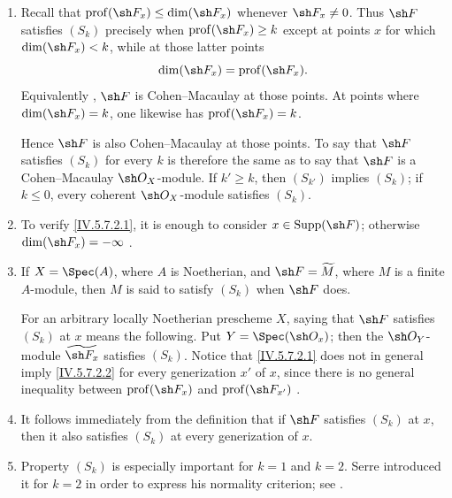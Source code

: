 \begin{remarks}[5.7.3]
\label{IV.5.7.3}
\begin{enumerate}[{\rm(i)}]
\item
{}
\label{IV.5.7.3.i}
Recall that
$\operatorname{prof}(\sh F_x)\leq\dim(\sh F_x)$
 whenever $\sh F_x\neq0$.  Thus $\sh F$
satisfies $(S_k)$ precisely when
$\operatorname{prof}(\sh F_x)\geq k$ except at points $x$ for which
$\dim(\sh F_x)<k$, while at those latter points
\[
\dim(\sh F_x)=\operatorname{prof}(\sh F_x).
\]
Equivalently , $\sh F$ is Cohen--Macaulay at those
points.  At points where $\dim(\sh F_x)=k$, one likewise has
$\operatorname{prof}(\sh F_x)=k$.


Hence $\sh F$ is also Cohen--Macaulay at those points.  To say that
$\sh F$ satisfies $(S_k)$ for every $k$ is therefore the same as to
say that $\sh F$ is a Cohen--Macaulay $\sh O_X$-module.  If
$k'\geq k$, then $(S_{k'})$ implies $(S_k)$; if $k\leq0$, every
coherent $\sh O_X$-module satisfies $(S_k)$.

\item
{}
\label{IV.5.7.3.ii}
To verify \eqref{IV.5.7.2.1}, it is enough to consider
$x\in\operatorname{Supp}(\sh F)$; otherwise
$\dim(\sh F_x)=-\infty$ .

\item
{}
\label{IV.5.7.3.iii}
If $X=\Spec(A)$, where $A$ is Noetherian, and
$\sh F=\widetilde M$, where $M$ is a finite $A$-module, then $M$ is
said to satisfy $(S_k)$ when $\sh F$ does.

For an arbitrary locally Noetherian prescheme $X$, saying that
$\sh F$ satisfies $(S_k)$ at $x$ means the following.  Put
$Y=\Spec(\sh O_x)$; then the $\sh O_Y$-module
$\widetilde{\sh F_x}$ satisfies $(S_k)$.  Notice that
\eqref{IV.5.7.2.1} does not in general imply
\eqref{IV.5.7.2.2} for every generization $x'$ of $x$, since there
is no general inequality between
$\operatorname{prof}(\sh F_x)$ and
$\operatorname{prof}(\sh F_{x'})$ .

\item
{}
\label{IV.5.7.3.iv}
It follows immediately from the definition that if $\sh F$
satisfies $(S_k)$ at $x$, then it also satisfies $(S_k)$ at every
generization of $x$.

\item
{}
\label{IV.5.7.3.v}
Property $(S_k)$ is especially important for $k=1$ and $k=2$.
Serre introduced it for $k=2$ in order to express his normality
criterion; see .


\end{enumerate}
\end{remarks}
